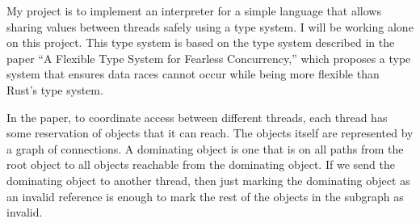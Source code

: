 \documentclass{article}
\begin{document}
  My project is to implement an interpreter for a simple language 
    that allows sharing values between threads safely using a type system.
  I will be working alone on this project.
  This type system is based on the type system described 
    in the paper ``A Flexible Type System for Fearless Concurrency,''
    which proposes a type system that ensures data races cannot occur
    while being more flexible than Rust's type system.

  In the paper,
    to coordinate access between different threads,
    each thread has some reservation of objects that it can reach.
  The objects itself are represented by a graph of connections.
  A dominating object is one that is on all paths 
    from the root object to all objects reachable from the dominating object.
  If we send the dominating object to another thread,
    then just marking the dominating object as an invalid reference
    is enough to mark the rest of the objects in the subgraph as invalid.
\end{document}
